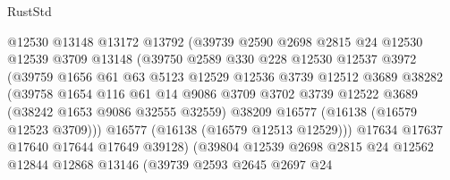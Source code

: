 \begin{lexlean}{RustStd}
\begin{coremodule}
                          @12530
                          @13148
                          @13172
                          @13792
                          (@39739
                            @2590
                            @2698
                            @2815
                            @24
                            @12530
                            @12539
                            @3709
                            @13148
                            (@39750
                              @2589
                              @330
                              @228
                              @12530
                              @12537
                              @3972
                              (@39759
                                @1656
                                @61
                                @63
                                @5123
                                @12529
                                @12536
                                @3739
                                @12512
                                @3689
                                @38282
                                (@39758
                                  @1654
                                  @116
                                  @61
                                  @14
                                  @9086
                                  @3709
                                  @3702
                                  @3739
                                  @12522
                                  @3689
                                  (@38242 @1653 @9086 @32555 @32559)
                                  @38209
                                  @16577
                                  (@16138 (@16579 @12523 @3709)))
                                @16577
                                (@16138 (@16579 @12513 @12529)))
                              @17634
                              @17637
                              @17640
                              @17644
                              @17649
                              @39128)
                            (@39804
                              @12539
                              @2698
                              @2815
                              @24
                              @12562
                              @12844
                              @12868
                              @13146
                              (@39739
                                @2593
                                @2645
                                @2697
                                @24

\end{coremodule}
\end{lexlean}
